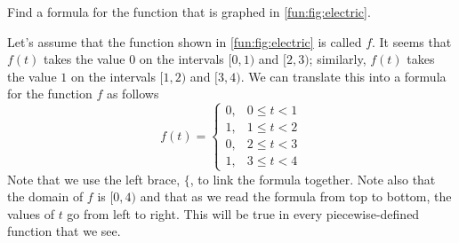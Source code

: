 \begin{pccexample}
Find a formula for the function that is graphed in \cref{fun:fig:electric}. 
\begin{pccsolution}
  Let's assume that the function shown in \cref{fun:fig:electric} is called $f$. 
  It seems that $f(t)$ takes the value $0$ on the intervals $[0,1)$ and $[2,3)$; 
  similarly, $f(t)$ takes the value $1$ on the intervals $[1,2)$ and $[3,4)$.
  We can translate this into a formula for the function $f$ as follows
  \[
        f(t)=
        \begin{cases}
          0,& 0\leq t <1\\
          1,& 1\leq t<2\\
          0,& 2\leq t<3\\
          1,& 3\leq t<4
        \end{cases}
  \]
  Note that we use the left brace, $\{$, to link the formula together. Note 
  also that the domain of $f$ is $[0,4)$ and that as we read the formula from top
  to bottom, the values of $t$ go from left to right. This will be true in 
  every piecewise-defined function that we see.
\end{pccsolution}
\end{pccexample}

